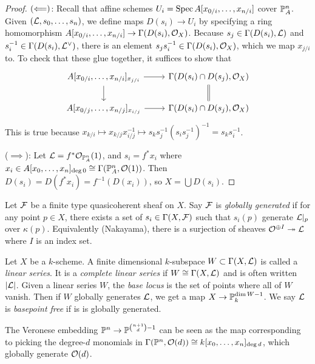 \documentclass[11pt]{amsart}
\begin{document}
\begin{proof}
    $(\Longleftarrow)$: Recall that affine schemes $U_i = \operatorname{Spec} A[x_{0/i},\dots,x_{n/i}]$ cover $\mathbb{P}_A^n$. Given $(\mathcal{L}, s_0,\dots,s_n)$, we define maps $D(s_i)\to U_i$ by specifying a ring homomorphism $A[x_{0/i},\dots,x_{n/i}] \to \Gamma(D(s_i), \mathcal{O}_X)$. Because $s_j\in \Gamma(D(s_i), \mathcal{L})$ and $s_i^{-1}\in \Gamma(D(s_i), \mathcal{L}^\vee)$, there is an element $s_js_i^{-1}\in \Gamma(D(s_i), \mathcal{O}_X)$, which we map $x_{j/i}$ to. To check that these glue together, it suffices to show that
    \[
    \begin{tikzcd}
    A[x_{0/i},\dots,x_{n/i}]_{x_{j/i}} \arrow[r] \arrow[d] & \Gamma(D(s_i)\cap D(s_j), \cO_X)\arrow[d, equal] \\
    A[x_{0/j},\dots,x_{n/j}]_{x_{i/j}} \arrow[r] & \Gamma(D(s_i)\cap D(s_j), \cO_X)
    \end{tikzcd}
    \]
    This is true because $x_{k/i}\mapsto x_{k/j}x_{i/j}^{-1}\mapsto s_ks_j^{-1}(s_is_j^{-1})^{-1} = s_ks_i^{-1}$.

    ($\implies$): Let $\mathcal{L} = f^\ast \mathcal{O}_{\mathbb{P}^n_A}(1)$, and $s_i = f^\ast x_i$ where $x_i\in A[x_0,\dots,x_n]_{\deg 0} \cong \Gamma(\mathbb{P}^n_A,\mathcal{O}(1))$. Then $D(s_i) = D(f^\ast x_i) = f^{-1}(D(x_i))$, so $X = \bigcup D(s_i)$.
\end{proof}


\begin{defn}
    Let $\mathcal{F}$ be a finite type quasicoherent sheaf on $X$. Say $\mathcal{F}$ is \emph{globally generated} if for any point $p\in X$, there exists a set of $s_i\in \Gamma(X, \mathcal{F})$ such that $s_i(p)$ generate $\mathcal{L}|_p$ over $\kappa(p)$. Equivalently (Nakayama), there is a surjection of sheaves $\mathcal{O}^{\oplus I} \twoheadrightarrow \mathcal{L}$ where $I$ is an index set.
\end{defn}


\begin{defn}
    Let $X$ be a $k$-scheme. A finite dimensional $k$-subspace $W\subset \Gamma(X, \mathcal{L})$ is called a \emph{linear series}. It is a \emph{complete linear series} if $W\cong \Gamma(X,\mathcal{L})$ and is often written $|\mathcal{L}|$. Given a linear series $W$, the \emph{base locus} is the set of points where all of $W$ vanish. Then if $W$ globally generates $\mathcal{L}$, we get a map $X\to \mathbb{P}^{\dim W - 1}_k$. We say $\mathcal{L}$ is \emph{basepoint free} if is is globally generated.
\end{defn}

\begin{exm}
    The Veronese embedding $\mathbb{P}^n\to \mathbb{P}^{\binom{n+1}{d}-1}$ can be seen as the map corresponding to picking the degree-$d$ monomials in $\Gamma(\mathbb{P}^n, \mathcal{O}(d)) \cong k[x_0,\dots,x_n]_{\deg d}$, which globally generate $\mathcal{O}(d)$.
\end{exm}
\end{document}
